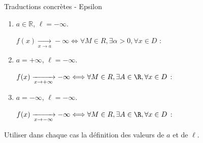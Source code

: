 \documentclass[12pt,a4paper]{report}
\begin{document}
\begin{definition}{Traductions concrètes - Epsilon}{}
\begin{enumerate}
    \item $a\in\mathbb{R}$, $\ell=-\infty$.
    \begin{center}
        $f(x) \xrightarrow[x\rightarrow a]{} -\infty \Longleftrightarrow \forall M \in R, \exists \alpha >0, \forall x \in D$ :  
    \end{center}

    \item $a = +\infty$, $\ell=-\infty$.
    \begin{center}
        $f(x) \xrightarrow[x\rightarrow +\infty]{} -\infty \Longleftrightarrow \forall M \in R, \exists A \in \R, \forall x \in D$ :  
    \end{center}
    
    \item $a = -\infty$, $\ell=-\infty$.
    \begin{center}
        $f(x) \xrightarrow[x\rightarrow -\infty]{} -\infty \Longleftrightarrow \forall M \in R, \exists A \in \R, \forall x \in D$ :  
    \end{center}
    
\end{enumerate}
\end{definition}

\begin{principedemo}{}
Utiliser dans chaque cas la définition des valeurs de $a$ et de $\ell$.
\end{principedemo}
\end{document}
